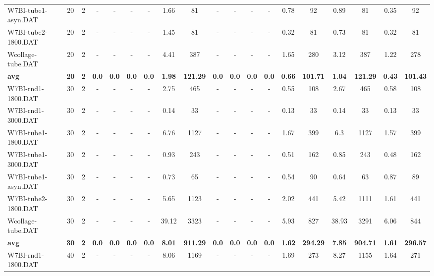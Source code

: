\begin{sidewaystable}[!ht]
{\begin{tabular}{lcccccccccccccccccc}
W7BI-tube1-asyn.DAT & 20 & 2 &  - &  - &  - &  - & 1.66 & 81 &  - &  - &  - &  - & 0.78 & 92 & 0.89 & 81 &  \textcolor{blue2}{0.35} & 92 \\
W7BI-tube2-1800.DAT & 20 & 2 &  - &  - &  - &  - & 1.45 & 81 &  - &  - &  - &  - &  \textcolor{blue2}{0.32} & 81 & 0.73 & 81 &  \textcolor{blue2}{0.32} & 81 \\
Wcollage-tube.DAT & 20 & 2 &  - &  - &  - &  - & 4.41 & 387 &  - &  - &  - &  - & 1.65 & 280 & 3.12 & 387 &  \textcolor{blue2}{1.22} & 278 \\
\cline{1-19} \textbf{avg} & \textbf{20} & \textbf{2} & \textbf{0.0} & \textbf{0.0} & \textbf{0.0} & \textbf{0.0} & \textbf{1.98} & \textbf{121.29} & \textbf{0.0} & \textbf{0.0} & \textbf{0.0} & \textbf{0.0} & \textbf{0.66} & \textbf{101.71} & \textbf{1.04} & \textbf{121.29} & \textbf{0.43} & \textbf{101.43} \\ \cline{1-19}
W7BI-rnd1-1800.DAT & 30 & 2 &  - &  - &  - &  - & 2.75 & 465 &  - &  - &  - &  - &  \textcolor{blue2}{0.55} & 108 & 2.67 & 465 & 0.58 & 108 \\
W7BI-rnd1-3000.DAT & 30 & 2 &  - &  - &  - &  - & 0.14 & 33 &  - &  - &  - &  - &  \textcolor{blue2}{0.13} & 33 & 0.14 & 33 &  \textcolor{blue2}{0.13} & 33 \\
W7BI-tube1-1800.DAT & 30 & 2 &  - &  - &  - &  - & 6.76 & 1127 &  - &  - &  - &  - & 1.67 & 399 & 6.3 & 1127 &  \textcolor{blue2}{1.57} & 399 \\
W7BI-tube1-3000.DAT & 30 & 2 &  - &  - &  - &  - & 0.93 & 243 &  - &  - &  - &  - & 0.51 & 162 & 0.85 & 243 &  \textcolor{blue2}{0.48} & 162 \\
W7BI-tube1-asyn.DAT & 30 & 2 &  - &  - &  - &  - & 0.73 & 65 &  - &  - &  - &  - &  \textcolor{blue2}{0.54} & 90 & 0.64 & 63 & 0.87 & 89 \\
W7BI-tube2-1800.DAT & 30 & 2 &  - &  - &  - &  - & 5.65 & 1123 &  - &  - &  - &  - & 2.02 & 441 & 5.42 & 1111 &  \textcolor{blue2}{1.61} & 441 \\
Wcollage-tube.DAT & 30 & 2 &  - &  - &  - &  - & 39.12 & 3323 &  - &  - &  - &  - &  \textcolor{blue2}{5.93} & 827 & 38.93 & 3291 & 6.06 & 844 \\
\cline{1-19} \textbf{avg} & \textbf{30} & \textbf{2} & \textbf{0.0} & \textbf{0.0} & \textbf{0.0} & \textbf{0.0} & \textbf{8.01} & \textbf{911.29} & \textbf{0.0} & \textbf{0.0} & \textbf{0.0} & \textbf{0.0} & \textbf{1.62} & \textbf{294.29} & \textbf{7.85} & \textbf{904.71} & \textbf{1.61} & \textbf{296.57} \\ \cline{1-19}
W7BI-rnd1-1800.DAT & 40 & 2 &  - &  - &  - &  - & 8.06 & 1169 &  - &  - &  - &  - & 1.69 & 273 & 8.27 & 1155 &  \textcolor{blue2}{1.64} & 271 \\

\end{tabular}}
\end{sidewaystable}
